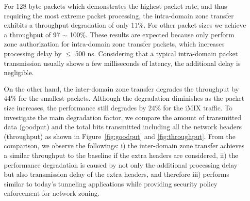 For 128-byte packets which demonstrates the highest packet rate, and thus requiring the most
extreme packet processing, the intra-domain zone transfer exhibits a throughput degradation
of only 11\%. For other packet sizes we achieve a throughput of 97 $\sim$ 100\%. These
results are expected because \tps only perform zone authorization for intra-domain zone transfer
packets, which increases processing delay by $\leq$ 500 ns. Considering that
a typical intra-domain packet transmission usually shows a few milliseconds of latency, the
additional delay is negligible.

On the other hand, the inter-domain zone transfer degrades the throughput by 44\% for the
smallest packets. Although the degradation diminishes as the packet size increases, the
performance still degrades by 24\% for the iMIX traffic. To investigate the main degradation
factor, we compare the amount of transmitted data (goodput) and the total bits transmitted
including all the network headers (throughput) as shown in Figure~\ref{fig:goodput} and
\ref{fig:throughput}. From the comparison, we observe the followings: i) the inter-domain
zone transfer achieves a similar throughput to the baseline if the extra headers are considered,
ii) the performance degradation is caused by not only the additional processing delay but also
transmission delay of the extra headers, and therefore iii) \name performs similar to
today's tunneling applications while providing security policy enforcement for network
zoning.







